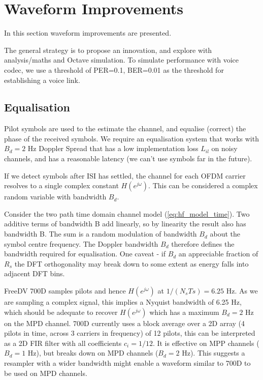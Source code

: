 \documentclass{article}
\begin{document}
\section{Waveform Improvements}

In this section waveform improvements are presented.

The general strategy is to propose an innovation, and explore with analysis/maths and Octave simulation. To simulate performance with voice codec, we use a threshold of PER=0.1, BER=0.01 as the threshold for establishing a voice link.

\subsection{Equalisation}

Pilot symbols are used to the estimate the channel, and equalise (correct) the phase of the received symbols.  We require an equalisation system that works with $B_d=2$ Hz Doppler Spread that has a low implementation loss $L_{il}$ on noisy channels, and has a reasonable latency (we can't use symbols far in the future).

If we detect symbols after ISI has settled, the channel for each OFDM carrier resolves to a single complex constant $H(e^{j \omega})$. This can be considered a complex random variable with bandwidth $B_d$. 

Consider the two path time domain channel model (\ref{eq:hf_model_time}). Two additive terms of bandwidth B add linearly, so by linearity the result also has bandwidth B.  The sum is a random modulation of bandwidth $B_d$ about the symbol centre frequency.  The Doppler bandwidth $B_d$ therefore defines the bandwidth required for equalisation. One caveat - if $B_d$ an appreciable fraction of $R_s$ the DFT orthogonality may break down to some extent as energy falls into adjacent DFT bins.

FreeDV 700D samples pilots and hence $H(e^{j \omega})$ at $1/(N_sTs)=6.25$ Hz.  As we are sampling a complex signal, this implies a Nyquist bandwidth of 6.25 Hz, which should be adequate to recover $H(e^{j \omega})$ which has a maximum $B_d=2$ Hz on the MPD channel. 700D currently uses a block average over a 2D array (4 pilots in time, across 3 carriers in frequency) of 12 pilots, this can be interpreted as a 2D FIR filter with all coefficients $c_i=1/12$. It is effective on MPP channels ($B_d=1$ Hz), but breaks down on MPD channels ($B_d=2$ Hz).  This suggests a resampler with a wider bandwidth might enable a waveform similar to 700D to be used on MPD channels.
\end{document}
